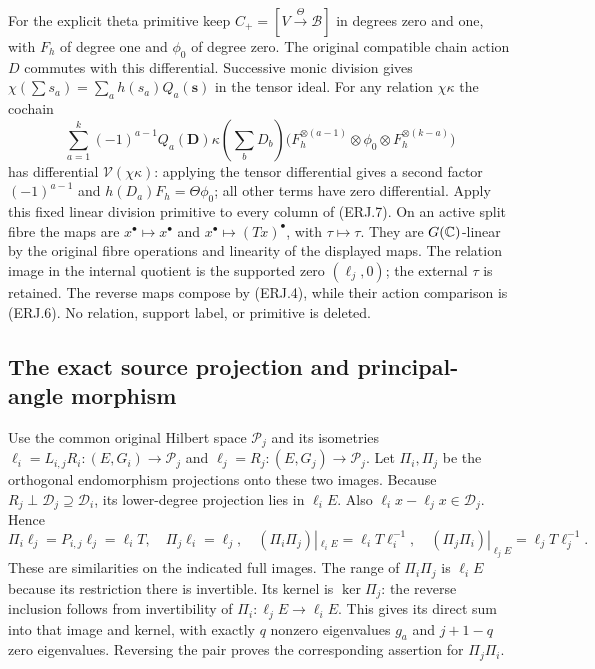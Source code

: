 For the explicit theta primitive keep
$C_+=[V\xrightarrow{\Theta}\mathscr B]$ in degrees zero and one,
with $F_h$ of degree one and $\phi_0$ of degree zero. The original
compatible chain action $D$ commutes with this differential.
Successive monic division gives
$\chi(\sum s_a)=\sum_a h(s_a)Q_a(\mathbf s)$ in the tensor ideal.
For any relation $\chi\kappa$ the cochain
\[
 \sum_{a=1}^k(-1)^{a-1}Q_a(\mathbf D)\kappa(\textstyle\sum_bD_b)
 \bigl(F_h^{\otimes(a-1)}\otimes\phi_0
                    \otimes F_h^{\otimes(k-a)}\bigr)\tag{ERJ.8}
\]
has differential $\mathcal V(\chi\kappa)$: applying the tensor
differential gives a second factor $(-1)^{a-1}$ and
$h(D_a)F_h=\Theta\phi_0$; all other terms have zero differential.
Apply this fixed linear division primitive to every column of (ERJ.7).
On an active split fibre the maps are $x^\bullet\mapsto x^\bullet$
and $x^\bullet\mapsto(Tx)^\bullet$, with $\tau\mapsto\tau$.
They are $G(\mathbb C)$-linear by the original fibre operations and linearity
of the displayed maps. The relation image in the internal quotient is
the supported zero $(\ell_j,0)$; the external $\tau$ is retained.
The reverse maps compose by (ERJ.4), while their action comparison
is (ERJ.6). No relation, support label, or primitive is deleted.

\subsection{The exact source projection and principal-angle morphism}
Use the common original Hilbert space $\mathcal P_j$ and its isometries
$\ell_i=L_{i,j}R_i:(E,G_i)\to\mathcal P_j$ and
$\ell_j=R_j:(E,G_j)\to\mathcal P_j$. Let $\Pi_i,\Pi_j$ be the
orthogonal endomorphism projections onto these two images. Because
$R_j\perp\mathcal D_j\supseteq\mathcal D_i$, its lower-degree
projection lies in $\ell_iE$. Also $\ell_ix-\ell_jx\in\mathcal D_j$.
Hence
\[
 \Pi_i\ell_j=P_{i,j}\ell_j=\ell_iT,\quad
 \Pi_j\ell_i=\ell_j,\quad
 (\Pi_i\Pi_j)|_{\ell_iE}=\ell_iT\ell_i^{-1},\quad
 (\Pi_j\Pi_i)|_{\ell_jE}=\ell_jT\ell_j^{-1}.\tag{ERJ.9}
\]
These are similarities on the indicated full images. The range of
$\Pi_i\Pi_j$ is $\ell_iE$ because its restriction there is invertible.
Its kernel is $\ker\Pi_j$: the reverse inclusion follows from
invertibility of $\Pi_i:\ell_jE\to\ell_iE$. This gives its direct
sum into that image and kernel, with exactly $q$ nonzero eigenvalues
$g_a$ and $j+1-q$ zero eigenvalues. Reversing the pair proves the
corresponding assertion for $\Pi_j\Pi_i$.

